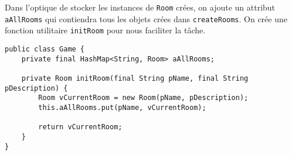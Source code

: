 \begin{exercise}[subtitle=getCommandList]
Dans l'optique de stocker les instances de \verb|Room| crées, on ajoute un attribut \verb|aAllRooms| qui contiendra tous les objets crées dans \verb|createRooms|. On crée une fonction utilitaire \verb|initRoom| pour nous faciliter la tâche.

\begin{verbatim}
public class Game {
    private final HashMap<String, Room> aAllRooms;

    private Room initRoom(final String pName, final String pDescription) {
        Room vCurrentRoom = new Room(pName, pDescription);
        this.aAllRooms.put(pName, vCurrentRoom);

        return vCurrentRoom;
    }
}
\end{verbatim}
\end{exercise}
